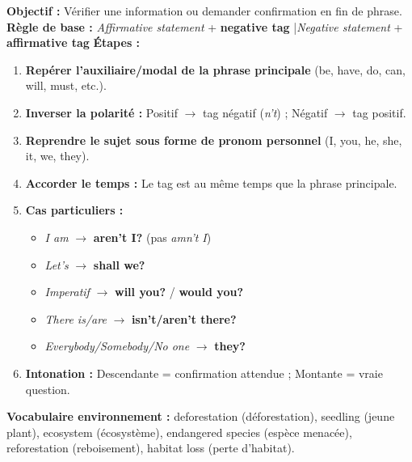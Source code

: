 \documentclass[11pt]{article}
\newcommand{\cle}[1]{{\popxbold\color{popdark}#1}}
\begin{document}
\begin{methode}
\textbf{Objectif :} Vérifier une information ou demander confirmation en fin de phrase.
\medskip
\textbf{Règle de base :} \emph{Affirmative statement} + \textbf{negative tag} \quad|\quad \emph{Negative statement} + \textbf{affirmative tag}
\medskip
\textbf{Étapes :}
\begin{enumerate}
    \item \textbf{Repérer l'auxiliaire/modal de la phrase principale} (be, have, do, can, will, must, etc.).
    \item \textbf{Inverser la polarité :} Positif $\rightarrow$ tag négatif (\emph{n't}) ; Négatif $\rightarrow$ tag positif.
    \item \textbf{Reprendre le sujet sous forme de pronom personnel} (I, you, he, she, it, we, they).
    \item \textbf{Accorder le temps :} Le tag est au même temps que la phrase principale.
    \item \textbf{Cas particuliers :}
    \begin{itemize}
        \item \emph{I am} $\rightarrow$ \textbf{aren't I?} (pas \emph{amn't I})
        \item \emph{Let's} $\rightarrow$ \textbf{shall we?}
        \item \emph{Imperatif} $\rightarrow$ \textbf{will you?} / \textbf{would you?}
        \item \emph{There is/are} $\rightarrow$ \textbf{isn't/aren't there?}
        \item \emph{Everybody/Somebody/No one} $\rightarrow$ \textbf{they?}
    \end{itemize}
    \item \textbf{Intonation :} Descendante = confirmation attendue ; Montante = vraie question.
\end{enumerate}
\textbf{Vocabulaire environnement :} \cle{deforestation} (déforestation), \cle{seedling} (jeune plant), \cle{ecosystem} (écosystème), \cle{endangered species} (espèce menacée), \cle{reforestation} (reboisement), \cle{habitat loss} (perte d'habitat).
\end{methode}
\end{document}
